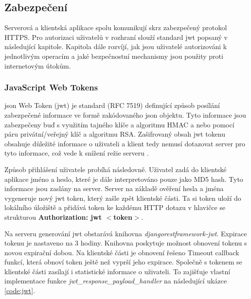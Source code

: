 \documentclass[a4paper,11pt,titlepage,fleqn]{article}
\begin{document}
    \subsection{Zabezpečení}
        Serverová a klientská aplikace spolu komunikují skrz zabezpečený protokol HTTPS. Pro autorizaci uživatelů v rozhraní slouží standard \gls{jwt} popsaný v následující kapitole. Kapitola dále rozvíjí, jak jsou uživatelé autorizováni k jednotlivým operacím a jaké bezpečnostní mechanismy jsou použity proti internetovým útokům.

        \subsubsection{JavaScript Web Tokens}
            \label{jwt}

            \gls{json} Web Token (\gls{jwt}) je standard (RFC 7519) definující způsob posílání zabezpečené informace ve formě zakódovaného \gls{json} objektu. Tyto informace jsou zabezpečeny buď s využitím tajného klíče a algoritmu HMAC a nebo pomocí páru privátní/veřejný klíč a algoritmu RSA. Zašifrovaný obsah \gls{jwt} tokenu obsahuje důležité informace o uživateli a klient tedy nemusí dotazovat server pro tyto informace, což vede k snížení režie serveru \cite{bib:jwt}.

            Způsob přihlášení uživatele probíhá následovně. Uživatel zadá do klientské aplikace jméno a heslo, které je dále interpretováno pouze jako MD5 hash. Tyto informace jsou zaslány na server. Server na základě ověření hesla a jména vygeneruje nový \gls{jwt} token, který zašle zpět klientské části. Ta si token uloží do lokálního úložiště a přidává token ke každému HTTP dotazu v hlavičce se strukturou \textbf{Authorization: \gls{jwt} $<$token$>$}.

            Na serveru generování \gls{jwt} obstarává knihovna \textit{djangorestframework-jwt}. Expirace tokenu je nastaveno na 3 hodiny. Knihovna poskytuje možnost obnovení tokenu s novou expirační dobou. Na klientské části je obnovení řešeno Timeout callback funkcí, která obnoví token ještě než vyprší jeho expirace. Společně s tokenem se klientské části zasílají i statistické informace o uživateli. To zajišťuje vlastní implementace funkce \textit{jwt\_response\_payload\_handler} na následující ukázce \ref{code:jwt}.
\end{document}
